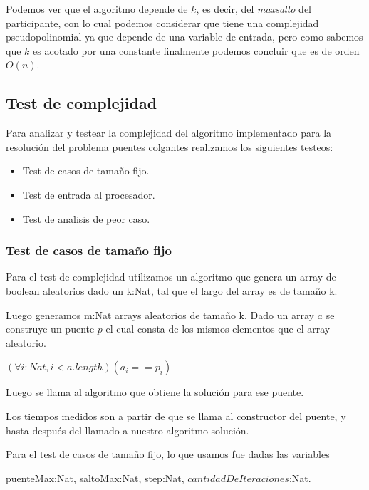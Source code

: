 Podemos ver que el algoritmo depende de $k$, es decir, del \textit{maxsalto} del participante, con lo cual podemos considerar que tiene una complejidad pseudopolinomial ya que depende de una variable de entrada, pero como sabemos que $k$ es acotado por una constante finalmente podemos concluir que es de orden $O(n)$.

\subsection{Test de complejidad}

Para analizar y testear la complejidad del algoritmo implementado para la resoluci\'on del problema puentes colgantes realizamos los siguientes testeos:

\begin{itemize}
  \item Test de casos de tamaño fijo.
  \item Test de entrada al procesador.
  \item Test de analisis de peor caso.
\end{itemize}

\newpage



\subsubsection{Test de casos de tamaño fijo}


Para el test de complejidad utilizamos un algoritmo que genera un array de boolean aleatorios dado un k:Nat, tal que el largo del array es de tamaño k.

Luego generamos m:Nat arrays aleatorios de tamaño k. Dado un array $a$ se construye un puente $p$ el cual consta de los mismos elementos que el array aleatorio. 

$(\forall i:Nat, i < a.length)(a_{i} == p_{i})$

Luego se llama al algoritmo que obtiene la soluci\'on para ese puente.

Los tiempos medidos son a partir de que se llama al constructor del puente, y hasta despu\'es del llamado a nuestro algoritmo soluci\'on.

Para el test de casos de tamaño fijo, lo que usamos fue dadas las variables 

puenteMax:Nat, saltoMax:Nat, step:Nat, $cantidadDeIteraciones$:Nat. 

